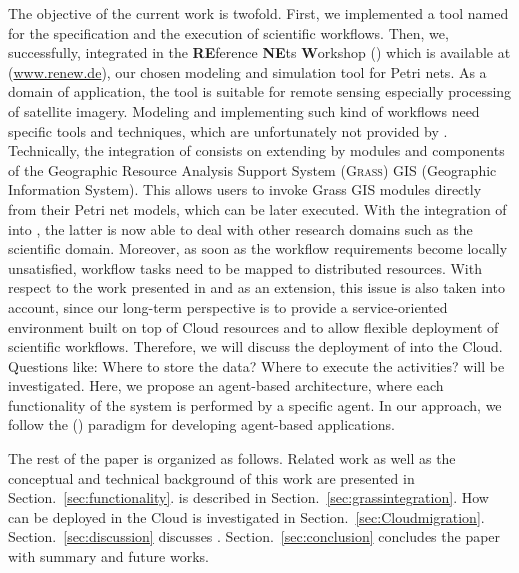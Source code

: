 The objective of the current work is twofold.
%
First, we implemented a tool named \RenewGrass{} for the specification and the execution of scientific workflows.
%
Then, we, successfully, integrated \RenewGrass{} in the \textbf{RE}ference \textbf{NE}ts \textbf{W}orkshop (\Renew{}) which is available at (\url{www.renew.de}), our chosen modeling and simulation tool for Petri nets.
%
%
As a domain of application, the tool is suitable for remote sensing especially processing of satellite imagery.
%
%
Modeling and implementing such kind of workflows need specific tools and techniques, which are unfortunately not provided by \Renew{}.
%
Technically, the integration of \RenewGrass{} consists on extending  \Renew{} by modules and components of the Geographic Resource Analysis Support System (\textsc{Grass}) GIS (Geographic Information System).
%
This allows users to invoke Grass GIS modules directly from their Petri net models, which can be later executed.
%
With the integration of \RenewGrass{} into \Renew{}, the latter is now able to deal with other research domains such as the scientific domain.
%
Moreover, as soon as the workflow requirements become locally unsatisfied, workflow tasks need to be mapped to distributed resources.
%
With respect to the work presented in \cite{Bendoukha+15c} and as an extension, this issue is also taken into account, since our long-term perspective is to provide a service-oriented environment built on top of Cloud resources and to allow flexible deployment of scientific workflows.
%
Therefore, we will discuss the deployment of \RenewGrass{} into the Cloud.
%
Questions like: Where to store the data? Where to execute the activities? will be investigated.
%
Here, we propose an agent-based architecture, where each functionality of the system is performed by a specific agent.
%
In our approach, we follow the \Paosel{} (\Paose{}) paradigm for developing agent-based applications.
%

The rest of the paper is organized as follows. 
%
Related work as well as the conceptual and technical background of this work are presented in Section.~\ref{sec:functionality}.
%
\RenewGrass{} is described in Section.~\ref{sec:grassintegration}. 
%
How \RenewGrass{} can be deployed in the Cloud is investigated in Section.~\ref{sec:Cloudmigration}.
%
Section.~\ref{sec:discussion} discusses .
%
Section.~\ref{sec:conclusion} concludes the paper with summary and future works.





